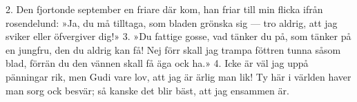 2.  Den fjortonde september en friare där kom,
    han friar till min flicka ifrån rosendelund:
    »Ja, du må tilltaga, som bladen grönska sig —
    tro aldrig, att jag sviker eller öfvergiver dig!»
3.  »Du fattige gosse, vad tänker du på,
    som tänker på en jungfru, den du aldrig kan få!
    Nej förr skall jag trampa föttren tunna såsom blad,
    förrän du den vännen skall få äga ock ha.»
4.  Icke är väl jag uppå pänningar rik,
    men Gudi vare lov, att jag är ärlig man lik!
    Ty här i världen haver man sorg ock besvär;
    så kanske det blir bäst, att jag ensammen är.
